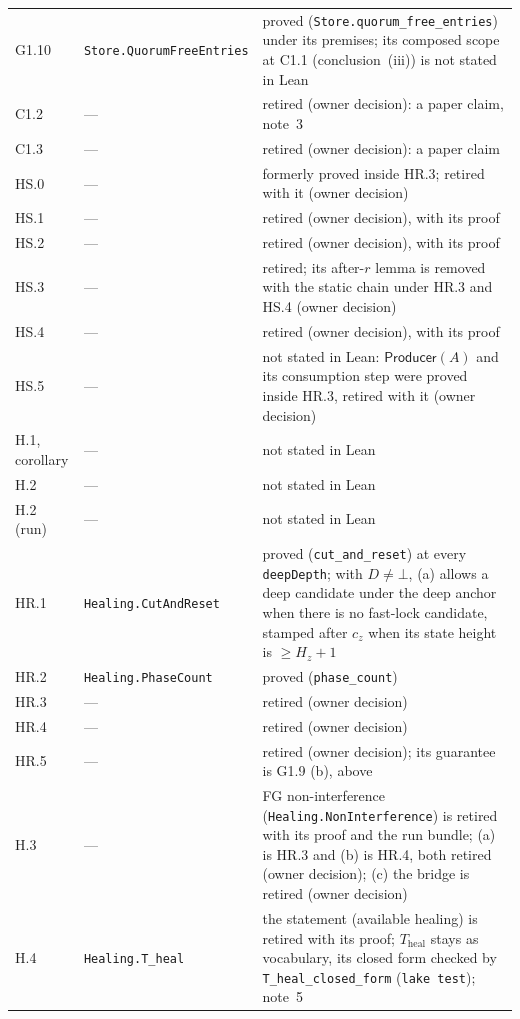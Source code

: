\documentclass{article}
\begin{document}
{\begin{longtable}{@{}>{\raggedright\arraybackslash}p{1.6cm}>{\raggedright\arraybackslash}p{6.2cm}>{\raggedright\arraybackslash}p{5.2cm}@{}}
G1.10 & \texttt{Store.QuorumFreeEntries} & proved (\texttt{Store.quorum\_free\_entries}) under its
  premises; its composed scope at C1.1 (conclusion~(iii)) is not stated in Lean\\
C1.2 & --- & retired (owner decision): a paper claim, note~3\\
C1.3 & --- & retired (owner decision): a paper claim\\
HS.0 & --- & formerly proved inside HR.3; retired with it (owner
  decision)\\
HS.1 & --- & retired (owner decision), with its proof\\
HS.2 & --- & retired (owner decision), with its proof\\
HS.3 & --- & retired; its after-$r$ lemma is removed with the static chain
  under HR.3 and HS.4 (owner decision)\\
HS.4 & --- & retired (owner decision), with its proof\\
HS.5 & --- & not stated in Lean: $\mathsf{Producer}(A)$ and its
  consumption step were proved inside HR.3, retired with it (owner
  decision)\\
H.1, corollary & --- & not stated in Lean\\
H.2 & --- & not stated in Lean\\
H.2 (run) & --- & not stated in Lean\\
HR.1 & \texttt{Healing.CutAndReset} & proved (\texttt{cut\_and\_reset}) at
  every \texttt{deepDepth}; with $D\neq\bot$, (a) allows a deep candidate
  under the deep anchor when there is no fast-lock candidate, stamped after
  $c_z$ when its state height is $\geq H_z+1$\\
HR.2 & \texttt{Healing.PhaseCount} & proved (\texttt{phase\_count})\\
HR.3 & --- & retired (owner decision)\\
HR.4 & --- & retired (owner decision)\\
HR.5 & --- & retired (owner decision); its guarantee is G1.9 (b),
  above\\
H.3 & --- & FG non-interference
  (\texttt{Healing.NonInterference}) is retired with its proof and the run
  bundle; (a) is HR.3 and (b) is HR.4, both retired (owner decision); (c)
  the bridge is retired (owner decision)\\
H.4 & \texttt{Healing.T\_heal} & the statement (available healing) is
  retired with its proof; $T_{\mathrm{heal}}$ stays as vocabulary, its
  closed form checked by \texttt{T\_heal\_closed\_form} (\texttt{lake test});
  note~5\\

\end{longtable}}
\end{document}
